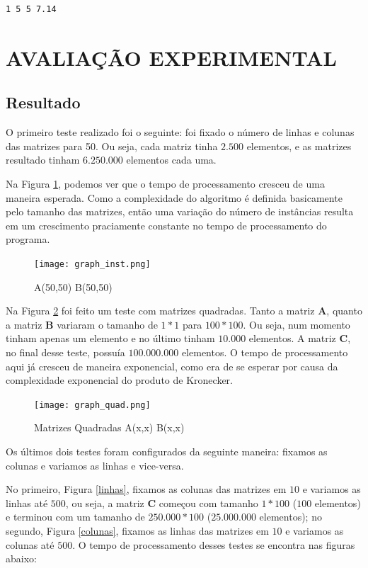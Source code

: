 \documentclass[12pt]{article}
\begin{document}
\begin{verbatim}
1 5 5 7.14
\end{verbatim}


\section{AVALIAÇÃO EXPERIMENTAL}
\label{avaliacao_experimental}


\subsection{Resultado}

	O primeiro teste realizado foi o seguinte: foi fixado o número de linhas e colunas das matrizes para 50. Ou seja, cada matriz tinha $2.500$ elementos, e as matrizes resultado tinham $6.250.000$ elementos cada uma.

	Na Figura \ref{instancias}, podemos ver que o tempo de processamento cresceu de uma maneira esperada. Como a complexidade do algoritmo é definida basicamente pelo tamanho das matrizes, então uma variação do número de instâncias resulta em um crescimento praciamente constante no tempo de processamento do programa.

\begin{figure}[p!]
	\centering
	\texttt{[image: graph\_inst.png]}
	\caption{A(50,50) B(50,50)}
	\label{instancias}
\end{figure}

	Na Figura \ref{quadradas} foi feito um teste com matrizes quadradas. Tanto a matriz \textbf{A}, quanto a matriz \textbf{B} variaram o tamanho de $ 1 * 1 $ para $ 100 * 100 $. Ou seja, num momento tinham apenas um elemento e no último tinham $10.000$ elementos. A matriz \textbf{C}, no final desse teste, possuía $100.000.000$ elementos. O tempo de processamento aqui já cresceu de maneira exponencial, como era de se esperar por causa da complexidade exponencial do produto de Kronecker.


\begin{figure}[p!]
	\centering
	\texttt{[image: graph\_quad.png]}
	\caption{Matrizes Quadradas A(x,x) B(x,x)}
	\label{quadradas}
\end{figure}

	Os últimos dois testes foram configurados da seguinte maneira: fixamos as colunas e variamos as linhas e vice-versa.

No primeiro, Figura \ref{linhas}, fixamos as colunas das matrizes em $10$ e variamos as linhas até $500$, ou seja, a matriz \textbf{C} começou com tamanho $1 * 100$ ($100$ elementos) e terminou com um tamanho de $250.000 * 100$ ($25.000.000$ elementos); no segundo, Figura \ref{colunas}, fixamos as linhas das matrizes em $10$ e variamos as colunas até $500$. O tempo de processamento desses testes se encontra nas figuras abaixo:
\end{document}
